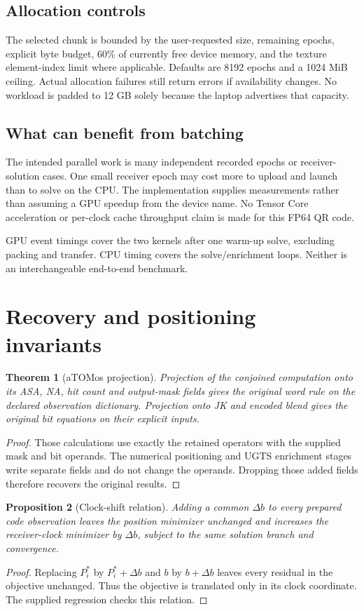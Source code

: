 \documentclass[11pt,a4paper]{article}
\newtheorem{proposition}{Proposition}[section]
\newtheorem{theorem}[proposition]{Theorem}
\begin{document}
\subsection{Allocation controls}
The selected chunk is bounded by the user-requested size, remaining epochs, explicit byte budget,
60\% of currently free device memory, and the texture element-index limit where applicable. Defaults are
8192 epochs and a 1024 MiB ceiling. Actual allocation failures still return errors if availability changes.
No workload is padded to 12 GB solely because the laptop advertises that capacity.

\subsection{What can benefit from batching}
The intended parallel work is many independent recorded epochs or receiver-solution cases. One small
receiver epoch may cost more to upload and launch than to solve on the CPU. The implementation supplies
measurements rather than assuming a GPU speedup from the device name. No Tensor Core acceleration or
per-clock cache throughput claim is made for this FP64 QR code.

GPU event timings cover the two kernels after one warm-up solve, excluding packing and transfer. CPU timing
covers the solve/enrichment loops. Neither is an interchangeable end-to-end benchmark.
\clearpage
\section{Recovery and positioning invariants}
\begin{theorem}[aTOMos projection]
Projection of the conjoined computation onto its ASA, NA, hit count and output-mask fields gives the
original word rule on the declared observation dictionary. Projection onto JK and encoded blend gives
the original bit equations on their explicit inputs.
\end{theorem}
\begin{proof}
Those calculations use exactly the retained operators with the supplied mask and bit operands. The numerical
positioning and UGTS enrichment stages write separate fields and do not change the operands. Dropping
those added fields therefore recovers the original results.
\end{proof}

\begin{proposition}[Clock-shift relation]
Adding a common $\Delta b$ to every prepared code observation leaves the position minimizer unchanged
and increases the receiver-clock minimizer by $\Delta b$, subject to the same solution branch and convergence.
\end{proposition}
\begin{proof}
Replacing $P_i^*$ by $P_i^*+\Delta b$ and $b$ by $b+\Delta b$ leaves every residual in the objective unchanged.
Thus the objective is translated only in its clock coordinate. The supplied regression checks this relation.
\end{proof}
\end{document}
